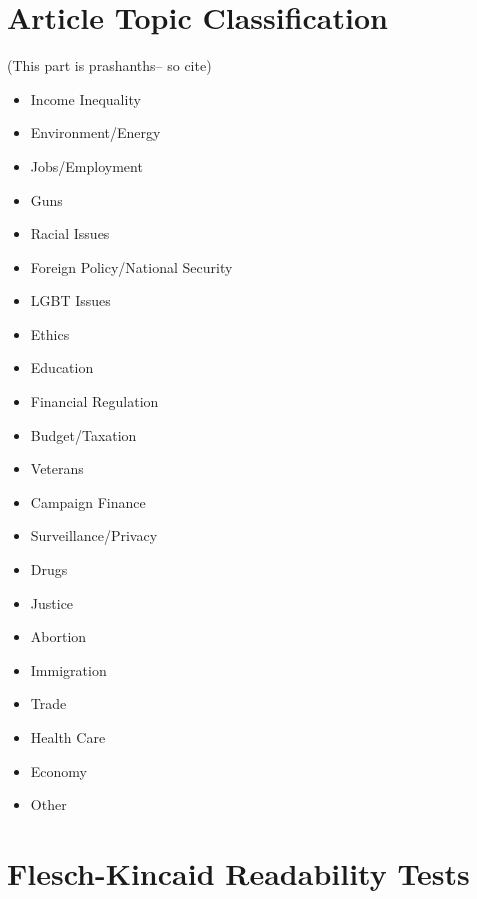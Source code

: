 \section{Article Topic Classification}
(This part is prashanths-- so cite)
\begin{itemize}
  \item Income Inequality
  \item Environment/Energy
  \item Jobs/Employment
  \item Guns
  \item Racial Issues
  \item Foreign Policy/National Security
  \item LGBT Issues
  \item Ethics
  \item Education
  \item Financial Regulation
  \item Budget/Taxation
  \item Veterans
  \item Campaign Finance
  \item Surveillance/Privacy
  \item Drugs
  \item Justice
  \item Abortion
  \item Immigration
  \item Trade
  \item Health Care
  \item Economy
  \item Other 
\end{itemize}
 


\section{Flesch-Kincaid Readability Tests} 

















